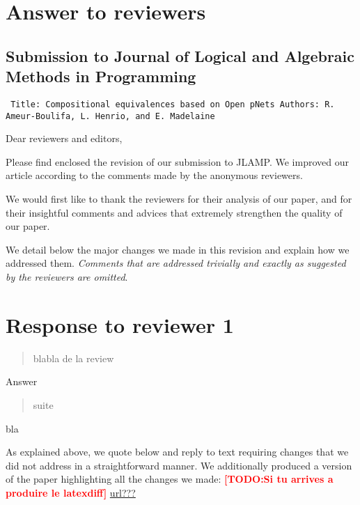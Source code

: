 \documentclass[10pt]{article}
\newenvironment{ttbox}{\begin{alltt}\small\tt}%
                      {\end{alltt}}
\newenvironment{review}{\bgroup\itshape\begin{quote}}{\end{quote}\egroup}
\newcommand{\TODO}[1]{\textcolor{red}{\textbf{[TODO:#1]}}}
\begin{document}
\section*{Answer to reviewers }
\subsection*{Submission to Journal of Logical and Algebraic Methods in Programming}
\medskip
\begin{ttbox}
Title: Compositional equivalences based on Open pNets
Authors: R. Ameur-Boulifa, L. Henrio, and E. Madelaine
\end{ttbox}
\bigskip
Dear reviewers and editors,

Please find enclosed the revision of our submission to JLAMP. We improved our article according to the comments made by the
anonymous reviewers.

We would first like to thank the reviewers for their analysis of our
paper, and for their insightful comments and advices that extremely strengthen the quality of our paper.

We detail below the major changes we made in this revision and explain how we addressed them.  \emph{Comments that are  addressed trivially and exactly as suggested by the reviewers are omitted}.  

\medskip



\section*{Response to reviewer 1}

\begin{review}
blabla de la review
\end{review}
Answer

\begin{review}
suite
\end{review}
bla


\newpage



As explained above, we quote below and reply to text requiring changes that we did not  address in a straightforward manner. We additionally produced a version of the paper highlighting all the changes we made: \TODO{Si tu arrives a produire le latexdiff} \url{url???}
\end{document}
